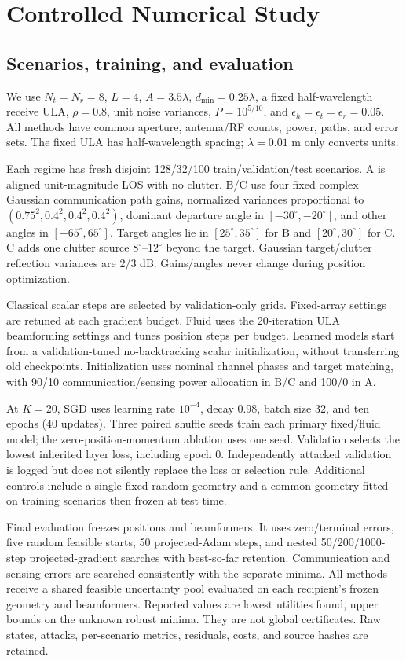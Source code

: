 \documentclass[10pt,journal,onecolumn,draftclsnofoot]{IEEEtran}
\begin{document}
\section{Controlled Numerical Study}
\subsection{Scenarios, training, and evaluation}
We use $N_t=N_r=8$, $L=4$, $A=3.5\lambda$, $d_{\min}=0.25\lambda$, a fixed half-wavelength receive ULA, $\rho=0.8$, unit noise variances, $P=10^{5/10}$, and $\epsilon_h=\epsilon_t=\epsilon_r=0.05$. All methods have common aperture, antenna/RF counts, power, paths, and error sets. The fixed ULA has half-wavelength spacing; $\lambda=0.01$ m only converts units.

Each regime has fresh disjoint 128/32/100 train/validation/test scenarios. A is aligned unit-magnitude LOS with no clutter. B/C use four fixed complex Gaussian communication path gains, normalized variances proportional to $(0.75^2,0.4^2,0.4^2,0.4^2)$, dominant departure angle in $[-30^\circ,-20^\circ]$, and other angles in $[-65^\circ,65^\circ]$. Target angles lie in $[25^\circ,35^\circ]$ for B and $[20^\circ,30^\circ]$ for C. C adds one clutter source $8^\circ$--$12^\circ$ beyond the target. Gaussian target/clutter reflection variances are 2/3 dB. Gains/angles never change during position optimization.

Classical scalar steps are selected by validation-only grids. Fixed-array settings are retuned at each gradient budget. Fluid uses the 20-iteration ULA beamforming settings and tunes position steps per budget. Learned models start from a validation-tuned no-backtracking scalar initialization, without transferring old checkpoints. Initialization uses nominal channel phases and target matching, with 90/10 communication/sensing power allocation in B/C and 100/0 in A.

At $K=20$, SGD uses learning rate $10^{-4}$, decay $0.98$, batch size 32, and ten epochs (40 updates). Three paired shuffle seeds train each primary fixed/fluid model; the zero-position-momentum ablation uses one seed. Validation selects the lowest inherited layer loss, including epoch 0. Independently attacked validation is logged but does not silently replace the loss or selection rule. Additional controls include a single fixed random geometry and a common geometry fitted on training scenarios then frozen at test time.

Final evaluation freezes positions and beamformers. It uses zero/terminal errors, five random feasible starts, 50 projected-Adam steps, and nested 50/200/1000-step projected-gradient searches with best-so-far retention. Communication and sensing errors are searched consistently with the separate minima. All methods receive a shared feasible uncertainty pool evaluated on each recipient's frozen geometry and beamformers. Reported values are lowest utilities found, upper bounds on the unknown robust minima. They are not global certificates. Raw states, attacks, per-scenario metrics, residuals, costs, and source hashes are retained.
\end{document}
